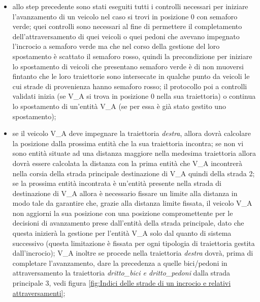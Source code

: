 \begin{enumerate}
\begin{enumerate}
\begin{itemize}
\item allo step precedente sono stati eseguiti tutti i controlli necessari per iniziare l'avanzamento di un veicolo nel caso si trovi in posizione 0 con semaforo verde; quei controlli sono necessari al fine di permettere il completamento dell'attraversamento di quei veicoli o quei pedoni che avevano impegnato l'incrocio a semaforo verde ma che nel corso della gestione del loro spostamento è scattato il semaforo rosso, quindi la precondizione per iniziare lo spostamento di veicoli che presentano semaforo verde è di non muoversi fintanto che le loro traiettorie sono intersecate in qualche punto da veicoli le cui strade di provenienza hanno semaforo rosso; il protocollo poi a controlli validati inizia (se V\_A si trova in posizione 0 nella sua traiettoria) o continua lo spostamento di un'entità V\_A (se per essa è già stato gestito uno spostamento);
\item se il veicolo V\_A deve impegnare la traiettoria \textit{destra}, allora dovrà calcolare la posizione dalla prossima entità che la sua traiettoria incontra; se non vi sono entità situate ad una distanza maggiore nella medesima traiettoria allora dovrà essere calcolata la distanza con la prima entità che V\_A incontrerà nella corsia della strada principale destinazione di V\_A quindi della strada 2; se la prossima entità incontrata è un'entità presente nella strada di destinazione di V\_A allora è necessario fissare un limite alla distanza in modo tale da garantire che, grazie alla distanza limite fissata, il veicolo V\_A non aggiorni la sua posizione con una posizione compromettente per le decisioni di avanzamento prese dall'entità della strada principale, dato che questa inizierà la gestione per l'entità V\_A solo dal quanto di sistema successivo (questa limitazione è fissata per ogni tipologia di traiettoria gestita dall'incrocio); V\_A inoltre se procede nella traiettoria \textit{destra} dovrà, prima di completare l'avanzamento, dare la precedenza a quelle bici/pedoni in attraversamento la traiettoria \textit{drit\-to\_bi\-ci e drit\-to\_pe\-do\-ni} dalla strada principale 3, vedi figura \ref{fig:Indici delle strade di un incrocio e relativi attraversamenti};

\end{itemize}
\end{enumerate}
\end{enumerate}
